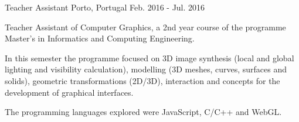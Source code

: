 \begin{cventries}
  \cventry
    {Teacher Assistant} %
    {} %
    {Porto, Portugal} %
    {Feb. 2016 - Jul. 2016} %
    {
      \begin{cvitems} %
        \item{Teacher Assistant of Computer Graphics, a 2nd year course of the programme Master's in Informatics and Computing Engineering.}
        \item{In this semester the programme focused on 3D image synthesis (local and global lighting and visibility calculation), modelling (3D meshes, curves, surfaces and solids), geometric transformations (2D/3D), interaction and concepts for the development of graphical interfaces.}
        \item{The programming languages explored were JavaScript, C/C++ and WebGL.}
      \end{cvitems}
    }
\end{cventries}
